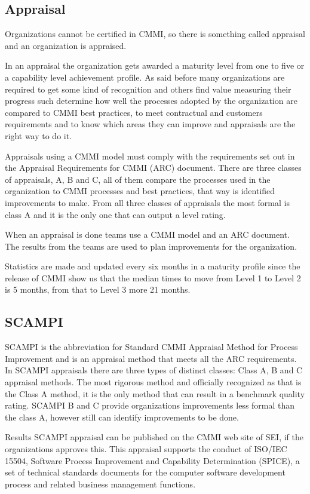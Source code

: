 \subsection{Appraisal}
Organizations cannot be certified in CMMI, so there is something called appraisal and an organization is appraised.

In an appraisal the organization gets awarded a maturity level from one to five or a capability level achievement profile. As said before many organizations are required to get some kind of recognition and others find value measuring their progress such determine how well the processes adopted by the organization are compared to CMMI best practices, to meet contractual and customers requirements and to know which areas they can improve and appraisals are the right way to do it.

Appraisals using a CMMI model must comply with the requirements set out in the Appraisal Requirements for CMMI (ARC) document. There are three classes of appraisals, A, B and C, all of them compare the processes used in the organization to CMMI processes and best practices, that way is identified improvements to make. From all three classes of appraisals the most formal is class A and it is the only one that can output a level rating.

When an appraisal is done teams use a CMMI model and an ARC document. The results from the teams are used to plan improvements for the organization.

Statistics are made and updated every six months in a maturity profile since the release of CMMI show us that the median times to move from Level 1 to Level 2 is 5 months, from that to Level 3 more 21 months.

\subsection{SCAMPI}
SCAMPI is the abbreviation for Standard CMMI Appraisal Method for Process Improvement and is an appraisal method that meets all the ARC requirements.
In SCAMPI appraisals there are three types of distinct classes: Class A, B and C appraisal methods. The most rigorous method and officially recognized as that is the Class A method, it is the only method that can result in a benchmark quality rating. SCAMPI B and C provide organizations improvements less formal than the class A, however still can identify improvements to be done.

Results SCAMPI appraisal can be published on the CMMI web site of SEI, if the organizations approves this. This appraisal supports the conduct of ISO/IEC 15504, Software Process Improvement and Capability Determination (SPICE), a set of technical standards documents for the computer software development process and related business management functions.


